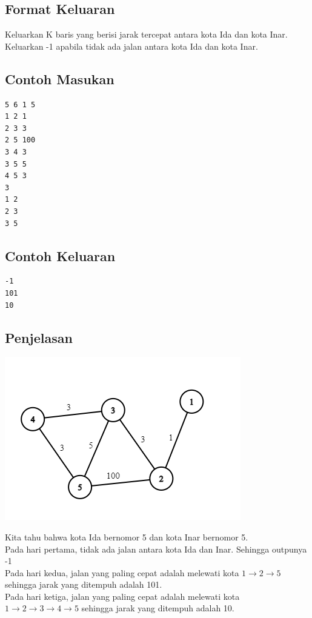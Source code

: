\documentclass{article}
\begin{document}
\subsection*{Format Keluaran}

Keluarkan K baris yang berisi jarak tercepat antara kota Ida dan kota Inar. Keluarkan -1 apabila tidak ada jalan antara kota Ida dan kota Inar.
\begin{multicols}{2}
\subsection*{Contoh Masukan}
\begin{lstlisting}
5 6 1 5
1 2 1
2 3 3
2 5 100
3 4 3
3 5 5
4 5 3
3
1 2
2 3
3 5
\end{lstlisting}
\columnbreak
\subsection*{Contoh Keluaran}
\begin{lstlisting}
-1
101
10
\end{lstlisting}
\vfill
\null
\end{multicols}





\pagebreak
\subsection*{Penjelasan}
\begin{center}
 \includegraphics[scale=1.0]{graph_shortest.png}

\end{center}
Kita tahu bahwa kota Ida bernomor 5 dan kota Inar bernomor 5.\\
Pada hari pertama, tidak ada jalan antara kota Ida dan Inar. Sehingga outpunya -1\\
Pada hari kedua, jalan yang paling cepat adalah melewati kota $1 \rightarrow 2 \rightarrow 5$ sehingga jarak yang ditempuh adalah 101.\\ 
Pada hari ketiga, jalan yang paling cepat adalah melewati kota $1 \rightarrow 2 \rightarrow 3 \rightarrow 4 \rightarrow 5$ sehingga jarak yang ditempuh adalah 10.
\end{document}
